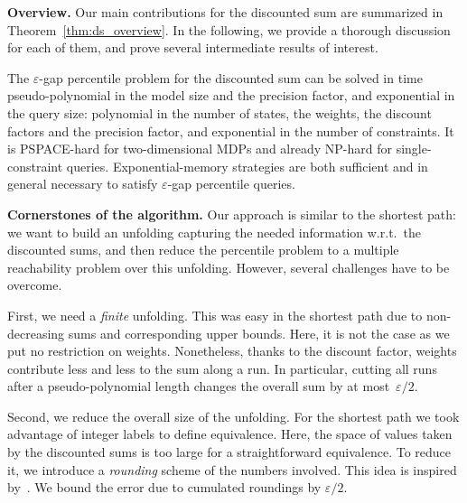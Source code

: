 \documentclass{llncs}
\newcommand\NPTIME{\textrm{\sf NP}}
\newcommand\PSPACE{\textrm{\sf PSPACE}}
\begin{document}
\smallskip\noindent\textbf{Overview.} Our main contributions for the discounted sum are summarized in Theorem~\ref{thm:ds_overview}. In the following, we provide a thorough discussion for each of them, and prove several intermediate results of interest.
 
\begin{theorem}
\label{thm:ds_overview}
The $\varepsilon$-gap percentile problem for the discounted sum can be solved in time pseudo-polynomial in the model size and the precision factor, and exponential in the query size: polynomial in the number of states, the weights, the discount factors and the precision factor, and exponential in the number of constraints. It is \PSPACE-hard for two-dimensional MDPs and already \NPTIME-hard for single-constraint queries. Exponential-memory strategies are both sufficient and in general necessary to satisfy $\varepsilon$-gap percentile queries.
\end{theorem}

\smallskip\noindent\textbf{Cornerstones of the algorithm.} Our approach is similar to the shortest path: we want to build an unfolding capturing the needed information w.r.t.~the discounted sums, and then reduce the percentile problem to a multiple reachability problem over this unfolding. However, several challenges have to be overcome.

First, we need a \textit{finite} unfolding. This was easy in the shortest path due to non-decreasing sums and corresponding upper bounds. Here, it is not the case as we put no restriction on weights. 
Nonetheless, thanks to the discount factor, weights contribute less and less to the sum along a run. In particular, cutting all runs after a pseudo-polynomial length changes the overall sum by at most~$\varepsilon/2$.

Second, we reduce the overall size of the unfolding.
For the shortest path we took advantage of integer labels to define equivalence. Here, the space of values taken by the discounted sums is too large for a straightforward equivalence.
To reduce it, we introduce a \textit{rounding} scheme of the numbers involved. This idea is inspired by~\cite{DBLP:conf/fsttcs/BrazdilCFNS13}. We bound the error due to cumulated roundings by $\varepsilon/2$.
\end{document}
